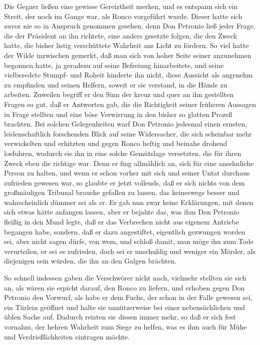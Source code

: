 Die Gegner ließen eine gewisse Gereiztheit merken, und es entspann
sich ein Streit, der noch im Gange war, als Ronco vorgeführt wurde.
Dieser hatte sich zuvor nie so in Anspruch genommen gesehen, denn
Don Petronio ließ jeder Frage, die der Präsident an ihn richtete,
eine anders gesetzte folgen, die den Zweck hatte, die bisher listig
verschüttete Wahrheit ans Licht zu fördern. So viel hatte der Wilde
inzwischen gemerkt, daß man sich von hoher Seite seiner anzunehmen
begonnen hatte, ja geradezu auf seine Befreiung hinarbeitete, und
seine vielberedete Stumpf- und Roheit hinderte ihn nicht, diese
Aussicht als angenehm zu empfinden\pagenum{[78]} und seinen
Helfern, soweit er sie verstand, in die Hände zu arbeiten. Zuweilen
begriff er den Sinn der kreuz und quer an ihn gestellten Fragen so
gut, daß er Antworten gab, die die Richtigkeit seiner früheren
Aussagen in Frage stellten und eine böse Verwirrung in den bisher
so glatten Prozeß brachten. Bei solchen Gelegenheiten warf Don
Petronio jedesmal einen ernsten, leidenschaftlich forschenden Blick
auf seine Widersacher, die sich scheinbar mehr verwickelten und
erhitzten und gegen Ronco heftig und beinahe drohend losfuhren,
wodurch sie ihn in eine solche Gemütslage versetzten, die für ihren
Zweck eben die richtige war. Denn er fing allmählich an, sich für
eine ansehnliche Person zu halten, und wenn er schon vorher mit
sich und seiner Untat durchaus zufrieden gewesen war, so glaubte er
jetzt vollends, daß er sich nichts von dem großmäuligen Tribunal
brauche gefallen zu lassen, das keineswegs besser und
wahrscheinlich dümmer sei als er. Er gab nun zwar keine
Erklärungen, mit denen sich etwas hätte anfangen lassen, aber er
bejahte das, was ihm Don Petronio fleißig in den Mund legte, daß er
das Verbrechen nicht aus eigenem Antriebe begangen habe, sondern,
daß er dazu angestiftet, eigentlich gezwungen worden sei, aber
nicht sagen dürfe, von wem, und schloß damit, man möge ihn zum Tode
verurteilen, er sei es zufrieden, doch sei er unschuldig und
weniger ein Mörder, als diejenigen sein würden, die ihn an den
Galgen brächten.

So schnell indessen gaben die Verschwörer nicht nach, vielmehr
stellten sie sich an, als wären sie erpicht darauf, den Ronco zu
liefern, und erhoben gegen Don Petronio den Vorwurf, als habe er
dem Fuchs, der schon in der Falle gewesen sei, ein Türlein geöffnet
und halte sie unnützerweise bei einer nebensächlichen und üblen
Sache auf.\pagenum{[79]} Dadurch reizten sie diesen immer mehr, so
daß er sich fest vornahm, der hehren Wahrheit zum Siege zu helfen,
was es ihm auch für Mühe und Verdrießlichkeiten eintragen möchte.


